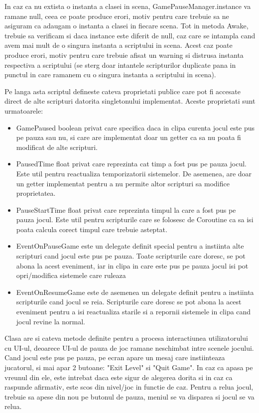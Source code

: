 \documentclass[12pt, a4paper]{article}
\begin{document}
	In caz ca nu extista o instanta a clasei in scena, GamePauseManager.instance va ramane null, ceea ce poate produce erori, motiv pentru care trebuie sa ne asiguram ca adaugam o instanta a clasei in fiecare scena. Tot in metoda Awake, trebuie sa verificam si daca instance este diferit de null, caz care se intampla cand avem mai mult de o singura instanta a scriptului in scena. Acest caz poate produce erori, motiv pentru care trebuie afisat un warning si distrusa instanta respectiva a scriptului (se sterg doar intantele scripturilor duplicate pana in punctul in care ramanem cu o singura instanta a scriptului in scena).
	\newline
	
	Pe langa asta scriptul defineste cateva proprietati publice care pot fi accesate direct de alte scripturi datorita singletonului implementat. Aceste proprietati sunt urmatoarele:
	
	\begin{itemize}
		\item GamePaused boolean privat care specifica daca in clipa curenta jocul este pus pe pauza sau nu, si care are implementat doar un getter ca sa nu poata fi modificat de alte scripturi.
		\item PausedTime float privat care reprezinta cat timp a fost pus pe pauza jocul. Este util pentru reactualiza temporizatorii sistemelor. De asemenea, are doar un getter implementat pentru a nu permite altor scripturi sa modifice proprietatea.
		\item PauseStartTime float privat care reprezinta timpul la care a fost pus pe pauza jocul. Este util pentru scripturile care se folosesc de Coroutine ca sa isi poata calcula corect timpul care trebuie asteptat.
		\item EventOnPauseGame este un delegate definit special pentru a instiinta alte scripturi cand jocul este pus pe pauza. Toate scripturile care doresc, se pot abona la acest eveniment, iar in clipa in care este pus pe pauza jocul isi pot opri/modifica sistemele care ruleaza
		\item EventOnResumeGame este de asemenea un delegate definit pentru a instiinta scripturile cand jocul se reia. Scripturile care doresc se pot abona la acest eveniment pentru a isi reactualiza starile si a repornii sistemele in clipa cand jocul revine la normal.
	\end{itemize}

	Clasa are si cateva metode definite pentru a procesa interactiunea utilizatorului cu UI-ul, deoarece UI-ul de pauza de joc ramane neschimbat intre scenele jocului. Cand jocul este pus pe pauza, pe ecran apare un mesaj care instiinteaza jucatorul, si mai apar 2 butoane: "Exit Level" si "Quit Game". In caz ca apasa pe vreunul din ele, este intrebat daca este sigur de alegerea dorita si in caz ca raspunde afirmativ, este scos din nivel/joc in functie de caz. Pentru a relua jocul, trebuie sa apese din nou pe butonul de pauza, meniul se va disparea si jocul se va relua.
	
\end{document}
